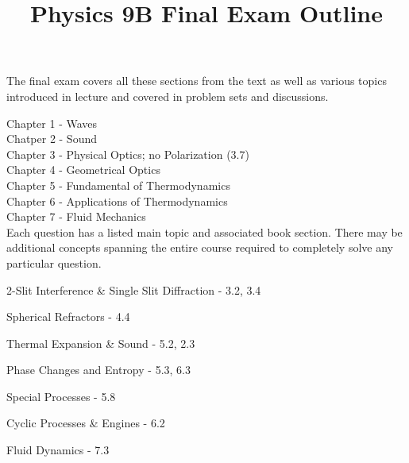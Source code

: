 \documentclass[10pt]{article}
\newenvironment{problem}[2][Problem]{\begin{trivlist}
\item[\hskip \labelsep {\bfseries #1}\hskip \labelsep {\bfseries #2.}]}{\end{trivlist}}
\begin{document}
 \title{Physics 9B Final Exam Outline}
\date{}
\maketitle

\noindent
The final exam covers all these sections from the text as well as various topics introduced in lecture and covered in problem sets and discussions.

\noindent
Chapter 1 - Waves\\
Chatper 2 - Sound\\
Chapter 3 - Physical Optics; no Polarization (3.7)\\
Chapter 4 - Geometrical Optics\\
Chapter 5 - Fundamental of Thermodynamics\\
Chapter 6 - Applications of Thermodynamics\\
Chapter 7 - Fluid Mechanics\\

\noindent
Each question has a listed main topic and associated book section. There may be additional concepts spanning the entire course required to completely solve any particular question.

\begin{problem}{1} 2-Slit Interference \& Single Slit Diffraction - 3.2, 3.4
\end{problem}

\begin{problem}{2} Spherical Refractors - 4.4
\end{problem}

\begin{problem}{3} Thermal Expansion \& Sound - 5.2, 2.3
\end{problem}

\begin{problem}{4} Phase Changes and Entropy - 5.3, 6.3
\end{problem}

\begin{problem}{5} Special Processes - 5.8
\end{problem}

\begin{problem}{6} Cyclic Processes \& Engines - 6.2
\end{problem}

\begin{problem}{7} Fluid Dynamics - 7.3
\end{problem}







\end{document}
